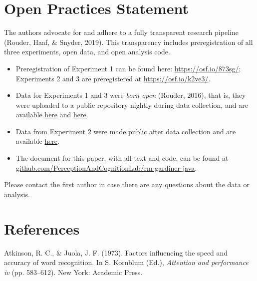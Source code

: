 \documentclass[english,,man]{apa6}
\begin{document}
\hypertarget{open-practices-statement}{%
\section{Open Practices Statement}\label{open-practices-statement}}

The authors advocate for and adhere to a fully transparent research pipeline (Rouder, Haaf, \& Snyder, 2019). This transparency includes preregistration of all three experiments, open data, and open analysis code.

\begin{itemize}
\item
  Preregistration of Experiment 1 can be found here: \url{https://osf.io/873sg/}; Experiments 2 and 3 are preregistered at \url{https://osf.io/k2ve3/}.
\item
  Data for Experiments 1 and 3 were \emph{born open} (Rouder, 2016), that is, they were uploaded to a public repository nightly during data collection, and are available \href{https://github.com/PerceptionCognitionLab/data1/tree/master/repGardinerJava/RKN_replication/RKN_exp1}{here} and \href{https://github.com/PerceptionCognitionLab/data1/tree/master/repGardinerJava/exp2/RKN_replication/RKN_exp2/SU}{here}.
\item
  Data from Experiment 2 were made public after data collection and are available \href{https://github.com/PerceptionCognitionLab/data0/tree/master/rm-gardiner-java}{here}.
\item
  The document for this paper, with all text and code, can be found at \href{https://github.com/PerceptionAndCognitionLab/rm-gardiner-java/tree/public/papers/current}{github.com/PerceptionAndCognitionLab/rm-gardiner-java}.
\end{itemize}

Please contact the first author in case there are any questions about the data or analysis.

\hypertarget{references}{%
\section{References}\label{references}}

\begingroup
\setlength{\parindent}{-0.5in}
\setlength{\leftskip}{0.5in}

\hypertarget{refs}{}
\leavevmode\hypertarget{ref-Atkinson:Juola:1973}{}%
Atkinson, R. C., \& Juola, J. F. (1973). Factors influencing the speed and accuracy of word recognition. In S. Kornblum (Ed.), \emph{Attention and performance iv} (pp. 583--612). New York: Academic Press.
\end{document}
